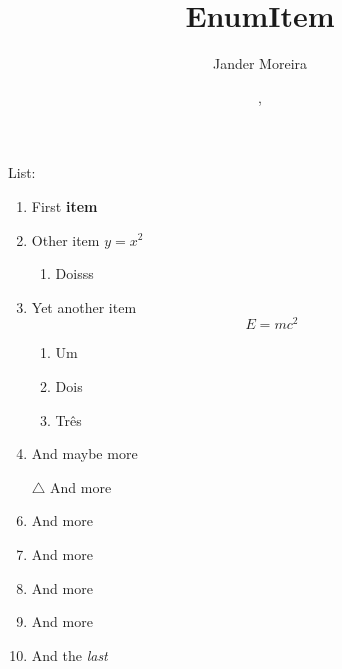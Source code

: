 \documentclass[12pt]{article}
\title{EnumItem}
\author{Jander Moreira}
\date{\monthname, \the\year}
\begin{document}

List:
\begin{enumerate}[((1))]<palette = Midnight Waters>
    \item First \textbf{item}
    \item Other item $y = x^2$
    \begin{enumerate}
        \item Doisss
    \end{enumerate}
    \item Yet another item
    \begin{equation}
        E = mc^2\label{eq:equation}
    \end{equation}
    \begin{enumerate}
        \item Um
        \item <3>Dois
        \item Três
    \end{enumerate}
    \item And maybe more
    \item [$\triangle$]And more
    \item And more
    \item And more
    \item And more
    \item And more
    \item And the \textit{last}
\end{enumerate}
\end{document}
